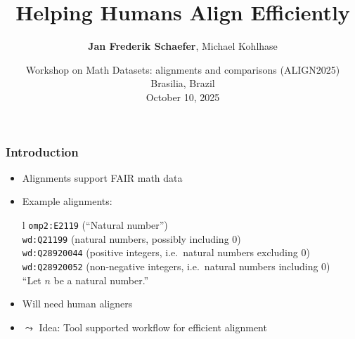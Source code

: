 \documentclass[aspectratio=169]{beamer}
\title{Helping Humans Align Efficiently}
\author{{\bf Jan Frederik Schaefer}, Michael Kohlhase}
\institute{FAU Erlangen-N\"urnberg}
\date{Workshop on Math Datasets: alignments and comparisons (ALIGN2025)\\Brasilia, Brazil\\October 10, 2025}
\def\texthl#1{\colorbox{yellow!50!red!70}{#1}}
\begin{document}
\frame\titlepage



\begin{frame}[fragile]
    \frametitle{Introduction}
    \renewcommand\arraystretch{1.2}%
    \begin{itemize}
        \item Alignments support FAIR math data 
            \pause
        \item Example alignments: %
            \quad\begin{tabular}l
                \texttt{omp2:E2119} (``Natural number'')\\
                    \hline
                    \hline
                \texttt{wd:Q21199} (natural numbers, possibly including 0)\\
                \pause
                \texttt{wd:Q28920044} (positive integers, i.e.\ natural numbers excluding 0)\\
                \texttt{wd:Q28920052} (non-negative integers, i.e.\ natural numbers including 0)\\
                    \hline
                    \hline
                \pause
                ``Let $n$ be a \texthl{natural number}.''\\
            \end{tabular}
            \pause
        \item Will need human aligners
        \item $\leadsto$ Idea: Tool supported workflow for efficient alignment
    \end{itemize}
\end{frame}
\end{document}
